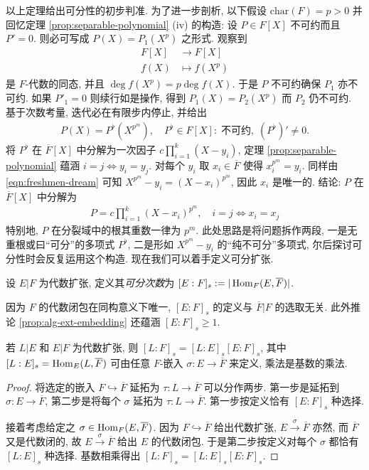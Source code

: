 以上定理给出可分性的初步判准. 为了进一步剖析, 以下假设 $\text{char}(F)=p > 0$ 并回忆定理 \ref{prop:separable-polynomial} (iv) 的构造: 设 $P \in F[X]$ 不可约而且 $P'=0$. 则必可写成 $P(X) = P_1(X^p)$ 之形式. 观察到
\begin{align*}
	F[X] & \longrightarrow F[X] \\
	f(X) & \longmapsto f(X^p)
\end{align*}
是 $F$-代数的同态, 并且 $\deg f(X^p) = p \deg f(X)$. 于是 $P$ 不可约确保 $P_1$ 亦不可约. 如果 $P'_1 = 0$ 则续行如是操作, 得到 $P_1(X) = P_2(X^p)$ 而 $P_2$ 仍不可约. 基于次数考量, 迭代必在有限步内停止, 并给出
\begin{gather}\label{eqn:P-to-P-flat}
	P(X) = P^\flat\left( X^{p^m} \right), \quad P^\flat \in F[X]:\; \text{不可约}, \; (P^\flat)' \neq 0.
\end{gather}
将 $P^\flat$ 在 $\overline{F}[X]$ 中分解为一次因子 $c \prod_{i=1}^k (X - y_i)$, 定理 \ref{prop:separable-polynomial} 蕴涵 $i = j \iff y_i=y_j$. 对每个 $y_i$ 取 $x_i \in \overline{F}$ 使得 $x_i^{p^m} = y_i$. 同样由 \eqref{eqn:freshmen-dream} 可知 $X^{p^m} - y_i = (X - x_i)^{p^m}$, 因此 $x_i$ 是唯一的. 结论: $P$ 在 $\overline{F}[X]$ 中分解为
\begin{gather*}
	P = c \prod_{i=1}^k (X - x_i)^{p^m}, \quad i=j \iff x_i = x_j
\end{gather*}
特别地, $P$ 在分裂域中的根其重数一律为 $p^m$. 此处思路是将问题拆作两段, 一是无重根或曰``可分''的多项式 $P^\flat$, 二是形如 $X^{p^m} - y_i$ 的``纯不可分''多项式, 尔后探讨可分性时会反复运用这个构造. 现在我们可以着手定义可分扩张.

\begin{definition}
	设 $E|F$ 为代数扩张, 定义其\emph{可分次数}为 $[E:F]_s := |\operatorname{Hom}_F(E, \overline{F})|$.
\end{definition}
因为 $F$ 的代数闭包在同构意义下唯一, $[E:F]_s$ 的定义与 $\overline{F}|F$ 的选取无关. 此外推论 \ref{prop:alg-ext-embedding} 还蕴涵 $[E:F]_s \geq 1$.

\begin{proposition}\label{prop:field-tower-sdegree}
	若 $L|E$ 和 $E|F$ 为代数扩张, 则 $[L:F]_s = [L:E]_s [E:F]_s$, 其中 $[L:E]_s = \operatorname{Hom}_E(L, \overline{F})$ 可由任意 $F$-嵌入 $\sigma: E \to \overline{F}$ 来定义, 乘法是基数的乘法.
\end{proposition}
\begin{proof}
	将选定的嵌入 $F \hookrightarrow \overline{F}$ 延拓为 $\tau: L \to \overline{F}$ 可以分作两步. 第一步是延拓到 $\sigma: E \to \overline{F}$, 第二步是将每个 $\sigma$ 延拓为 $\tau: L \to \overline{F}$. 第一步按定义恰有 $[E:F]_s$ 种选择.

	接着考虑给定之 $\sigma \in \operatorname{Hom}_F(E, \overline{F})$. 因为 $F \hookrightarrow \overline{F}$ 给出代数扩张, $E \xrightarrow{\sigma} \overline{F}$ 亦然, 而 $\overline{F}$ 又是代数闭的, 故 $E \xrightarrow{\sigma} \overline{F}$ 给出 $E$ 的代数闭包. 于是第二步按定义对每个 $\sigma$ 都恰有 $[L:E]_s$ 种选择. 基数相乘得出 $[L:F]_s = [L:E]_s [E:F]_s$.
\end{proof}

